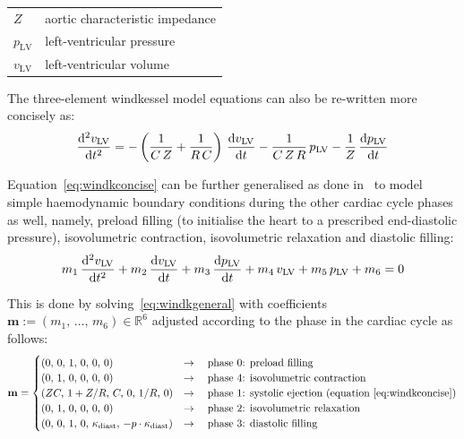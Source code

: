 \vspace{0.2cm}
\begin{tabular}{ll}
    $Z$ & aortic characteristic impedance \\
    $p_{\textrm{LV}}$ & left-ventricular pressure \\
    $v_{\textrm{LV}}$ & left-ventricular volume
\end{tabular}

\vspace{0.2cm}\noindent
The three-element windkessel model equations can also be re-written more concisely as:
%
\begin{equation}\label{eq:windkconcise}
    \dfrac{\mathrm{d}^2{v_{\textrm{LV}}}}{\mathrm{d}{t}^2} = -\left(\frac{1}{C\,Z}+\frac{1}{R\,C}\right)\,\dfrac{\mathrm{d}{v_{\textrm{LV}}}}{\mathrm{d}{t}}-\frac{1}{C\,Z\,R}\,p_{\textrm{LV}}-\frac{1}{Z}\,\dfrac{\mathrm{d}{p_{\textrm{LV}}}}{\mathrm{d}{t}}
\end{equation}

\vspace{0.2cm}
Equation~\eqref{eq:windkconcise} can be further generalised as done in~\cite{Land:2012} to model simple haemodynamic boundary conditions during the other cardiac cycle phases as well, namely, preload filling (to initialise the heart to a prescribed end-diastolic pressure), isovolumetric contraction, isovolumetric relaxation and diastolic filling:
%
\begin{equation}\label{eq:windkgeneral}
    m_1\,\dfrac{\mathrm{d}^2{v_{\textrm{LV}}}}{\mathrm{d}{t}^2} + m_2\,\dfrac{\mathrm{d}{v_{\textrm{LV}}}}{\mathrm{d}{t}} + m_3\,\dfrac{\mathrm{d}{p_{\textrm{LV}}}}{\mathrm{d}{t}} + m_4\,v_{\textrm{LV}} + m_5\,p_{\textrm{LV}} +  m_6 = 0
\end{equation}

\noindent
This is done by solving~\eqref{eq:windkgeneral} with coefficients  $\mathbf{m}:=(m_1,\,\dots,\,m_6)\in\mathbb{R}^6$ adjusted according to the phase in the cardiac cycle as follows:
%
\begin{equation}
    \mathbf{m} = \begin{cases}
    (0,\,0,\,1,\,0,\,0,\,0) & \rightarrow\quad\text{phase $0$: preload filling} \\
    (0,\,1,\,0,\,0,\,0,\,0) & \rightarrow\quad\text{phase $4$: isovolumetric contraction} \\
    (ZC,\,1+Z/R,\,C,\,0,\,1/R,\,0) & \rightarrow\quad\text{phase $1$: systolic ejection (equation~\eqref{eq:windkconcise})} \\
    (0,\,1,\,0,\,0,\,0,\,0) & \rightarrow\quad\text{phase $2$: isovolumetric relaxation} \\
    (0,\,0,\,1,\,0,\,\kappa_{\textrm{diast}},\,-p\cdot \kappa_{\textrm{diast}}) & \rightarrow\quad\text{phase $3$: diastolic filling}
    \end{cases}
\end{equation}

